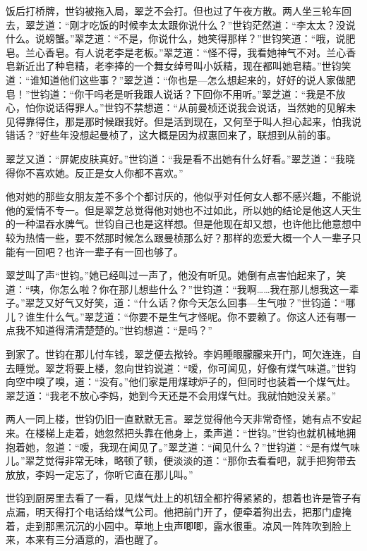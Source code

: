 \par 饭后打桥牌，世钧被拖入局，翠芝不会打。但也过了午夜方散。两人坐三轮车回去，翠芝道：“刚才吃饭的时候李太太跟你说什么？”世钧茫然道：“李太太？没说什么。说螃蟹。”翠芝道：“不是，你说什么，她笑得那样？”世钧笑道：“哦，说肥皂。兰心香皂。有人说老李是老板。”翠芝道：“怪不得，我看她神气不对。兰心香皂新近出了种皂精，老李捧的一个舞女绰号叫小妖精，现在都叫她皂精。”世钧笑道：“谁知道他们这些事？”翠芝道：“你也是—怎么想起来的，好好的说人家做肥皂！”世钧道：“你干吗老是听我跟人说话？下回你不用听。”翠芝道：“我是不放心，怕你说话得罪人。”世钧不禁想道：“从前曼桢还说我会说话，当然她的见解未见得靠得住，那是那时候跟我好。但是活到现在，又何至于叫人担心起来，怕我说错话？”好些年没想起曼桢了，这大概是因为叔惠回来了，联想到从前的事。
\par 翠芝又道：“屏妮皮肤真好。”世钧道：“我是看不出她有什么好看。”翠芝道：“我晓得你不喜欢她。反正是女人你都不喜欢。”
\par 他对她的那些女朋友差不多个个都讨厌的，他似乎对任何女人都不感兴趣，不能说他的爱情不专一。但是翠芝总觉得他对她也不过如此，所以她的结论是他这人天生的一种温吞水脾气。世钧自己也是这样想。但是他现在却又想，也许他比他意想中较为热情一些，要不然那时候怎么跟曼桢那么好？那样的恋爱大概一个人一辈子只能有一回吧？也许一辈子有一回也够了。
\par 翠芝叫了声“世钧。”她已经叫过一声了，他没有听见。她倒有点害怕起来了，笑道：“咦，你怎么啦？你在那儿想些什么？”世钧道：“我啊……我在那儿想我这一辈子。”翠芝又好气又好笑，道：“什么话？你今天怎么回事—生气啦？”世钧道：“哪儿？谁生什么气。”翠芝道：“你要不是生气才怪呢。你不要赖了。你这人还有哪一点我不知道得清清楚楚的。”世钧想道：“是吗？”
\par 到家了。世钧在那儿付车钱，翠芝便去揿铃。李妈睡眼朦朦来开门，呵欠连连，自去睡觉。翠芝将要上楼，忽向世钧说道：“嗳，你可闻见，好像有煤气味道。”世钧向空中嗅了嗅，道：“没有。”他们家是用煤球炉子的，但同时也装着一个煤气灶。翠芝道：“我老不放心李妈，她到今天还是不会用煤气灶。我就怕她没关紧。”
\par 两人一同上楼，世钧仍旧一直默默无言。翠芝觉得他今天非常奇怪，她有点不安起来。在楼梯上走着，她忽然把头靠在他身上，柔声道：“世钧。”世钧也就机械地拥抱着她，忽道：“嗳，我现在闻见了。”翠芝道：“闻见什么？”世钧道：“是有煤气味儿。”翠芝觉得非常无味，略顿了顿，便淡淡的道：“那你去看看吧，就手把狗带去放放，李妈一定忘了，你听它直在那儿叫。”
\par 世钧到厨房里去看了一看，见煤气灶上的机钮全都拧得紧紧的，想着也许是管子有点漏，明天得打个电话给煤气公司。他把前门开了，便牵着狗出去，把那门虚掩着，走到那黑沉沉的小园中。草地上虫声唧唧，露水很重。凉风一阵阵吹到脸上来，本来有三分酒意的，酒也醒了。
